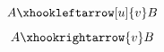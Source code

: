 \documentclass{article}
\begin{document}
\[ A \xhookleftarrow[u]{v} B \]
\[ A \xhookrightarrow{v} B \]
\end{document}
